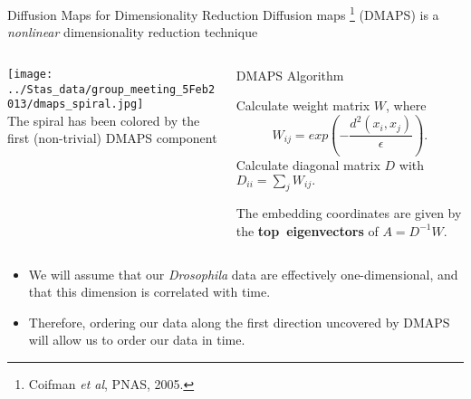 \begin{frame}{Diffusion Maps for Dimensionality Reduction}
\centering
Diffusion maps \footnote{ \tiny Coifman {\em et al}, PNAS, 2005.} (DMAPS) is a {\em nonlinear} dimensionality reduction technique

	\begin{columns}
	\begin{column}{0.4\textwidth}
		\texttt{[image: ../Stas\_data/group\_meeting\_5Feb2013/dmaps\_spiral.jpg]}\\
		\centering
		The spiral has been colored by the first (non-trivial) DMAPS component
	\end{column}
	\begin{column}{0.5\textwidth}
	\begin{block}{DMAPS Algorithm}
		{\scriptsize 
		Calculate weight matrix $W$, where
		$$W_{ij} = exp\left( -\frac{d^2(x_i, x_j)}{\epsilon} \right).$$
		Calculate diagonal matrix $D$ with $D_{ii} = \sum_j W_{ij}.$
		
		The embedding coordinates are given by the {\bf top~eigenvectors} of $A=D^{-1}W$.
		\par}
	\end{block}
	\end{column}
	\end{columns}

\vspace{0.1in}


\begin{itemize}
\item We will assume that our {\em Drosophila} data are effectively one-dimensional, and that this dimension is correlated with time. 
%
\item Therefore, ordering our data along the first direction uncovered by DMAPS will allow us to order our data in time. 
\end{itemize}

\end{frame}

